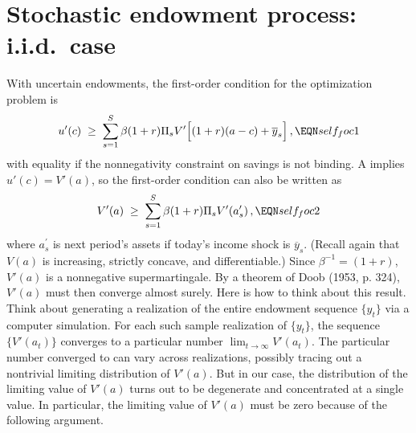 \section{Stochastic endowment process: i.i.d.\ case}

With uncertain endowments, the first-order condition for the
optimization problem   is
\offparens
$$
u'(c) \;\geq\; \sum_{s=1}^S \beta (1+r) \Pi_s
            V'\Bigl[(1+r)(a-c) + \overline y_s \Bigr]\,,              \EQN self_foc1
$$
\autoparens
with equality if the nonnegativity constraint on savings is
not binding. A  implies $u'(c)=V'(a)$,
so the first-order condition can also be written as
$$
V'(a) \;\geq\; \sum_{s=1}^S \beta (1+r) \Pi_s
            V'(a^\prime_s)\,,                             \EQN self_foc2
$$
where $a^\prime_s$ is next period's assets if today's income shock
is $\overline y_s$. (Recall again that $V(a)$ is increasing, strictly concave, and differentiable.)
 Since $\beta^{-1}=(1+r)$, $V'(a)$ is a nonnegative
supermartingale.
By a theorem of Doob (1953, p. 324),
$V'(a)$ must then converge almost surely. Here is how to think about this result.  Think about generating a   realization of the entire endowment sequence $\{y_t\}$ via a computer simulation.
  For each such sample realization of $\{y_t\}$, the sequence  $\{V'(a_t)\}$ converges to a particular number $\lim_{t\rightarrow \infty} V'(a_t)$.
  The particular number converged to can vary across realizations, possibly tracing out a nontrivial limiting distribution of $V'(a)$.
  But in our case, the distribution of the limiting value of $V'(a)$ turns out to be degenerate and concentrated at a single value.
%
%
In particular, the limiting value of $V'(a)$ must be zero because of the following
argument. %
